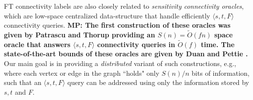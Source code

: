  
FT connectivity labels are also closely related to \emph{sensitivity connectivity oracles}, which are low-space centralized data-structure that handle efficiently $\langle s, t, F \rangle$ connectivity queries. \textbf{MP: The first construction of these oracles was given by Patrascu and Thorup \cite{patrascu2007planning} providing an $S(n)=\widetilde{O}(fn)$ space oracle that answers $\langle s,t, F \rangle$ connectivity queries in $\widetilde{O}(f)$ time. The state-of-the-art bounds of these oracles are given by Duan and Pettie \cite{DuanConnectivitySODA17}.} 
Our main goal is in providing a \emph{distributed} variant of such constructions, e.g., where each vertex or edge in the graph ``holds" only $S(n)/n$ bits of information, such that an $\langle s,t, F \rangle$ query can be addressed using only the information stored by $s,t$ and $F$. 


